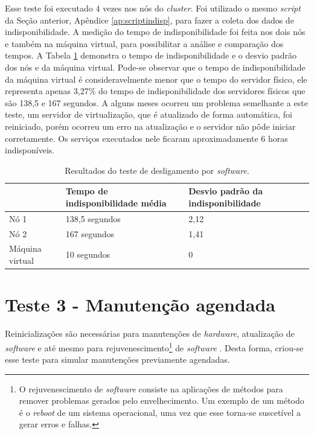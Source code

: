 Esse teste foi executado 4 vezes nos nós do \textit{cluster}. Foi utilizado o mesmo \textit{script} da Seção anterior, Apêndice 
\ref{ap:scriptindisp}, para fazer a coleta dos dados de indisponibilidade. A medição do tempo de indisponibilidade foi feita nos dois nós e 
também na máquina virtual, para possibilitar a análise e comparação dos tempos. A Tabela \ref{tab:teste2resultados} demonstra o tempo de 
indisponibilidade e o desvio padrão dos nós e da máquina virtual. Pode-se observar que o tempo de indisponibilidade da máquina virtual é 
consideravelmente menor que o tempo do servidor físico, ele representa apenas 3,27\% do tempo de indisponibilidade dos servidores físicos que são 
138,5 e 167 segundos. A alguns meses ocorreu um problema semelhante a este teste, um servidor de virtualização, que é atualizado de forma 
automática, foi reiniciado, porém ocorreu um erro na atualização e o servidor não pôde iniciar corretamente. Os serviços executados nele ficaram 
aproximadamente 6 horas indisponíveis.

\begin{table}[h!]
\caption{Resultados do teste de desligamento por \textit{software}.}
\label{tab:teste2resultados}
\begin{center}
\begin{tabular}{|l|l|l|}\hline
 & \textbf{Tempo de indisponibilidade média} & \textbf{Desvio padrão da indisponibilidade} \\\hline
Nó 1 & 138,5 segundos & 2,12 \\\hline
Nó 2 & 167 segundos & 1,41 \\\hline
Máquina virtual & 10 segundos & 0 \\\hline
\end{tabular}
\end{center}
\end{table}


\section{Teste 3 - Manutenção agendada}

Reinicializações são necessárias para manutenções de \textit{hardware}, atualização de \textit{software} e até mesmo para 
rejuvenescimento\footnote{O rejuvenescimento de \textit{software} consiste na aplicações de métodos para remover problemas gerados pelo 
envelhecimento. Um exemplo de um método é o \textit{reboot} de um sistema operacional, uma vez que esse torna-se suscetível a gerar erros e 
falhas.} de \textit{software} \cite{melo2014}. Desta forma, criou-se esse teste para simular manutenções previamente agendadas.

